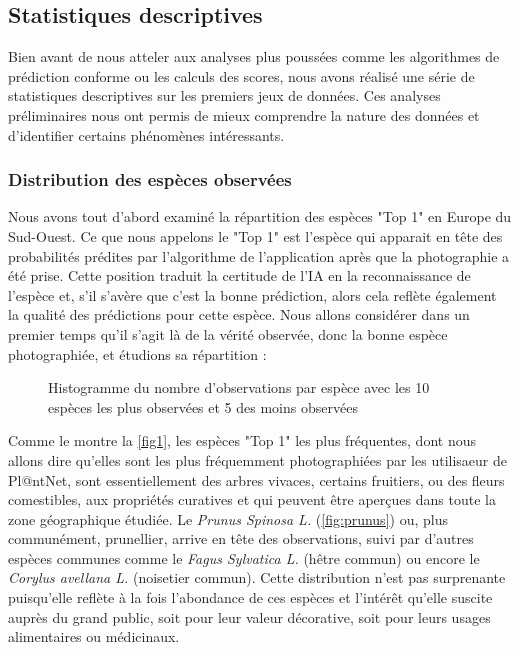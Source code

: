 \documentclass[a4paper,12pt]{article}
\begin{document}

\subsection{Statistiques descriptives}

Bien avant de nous atteler aux analyses plus poussées comme les algorithmes de prédiction conforme ou les calculs des scores, nous avons réalisé une série de statistiques descriptives sur les premiers jeux de données. Ces analyses préliminaires nous ont permis de mieux comprendre la nature des données et d'identifier certains phénomènes intéressants.

\subsubsection{Distribution des espèces observées}

Nous avons tout d'abord examiné la répartition des espèces "Top 1" en Europe du Sud-Ouest. Ce que nous appelons le "Top 1" est l'espèce qui apparait en tête des probabilités prédites par l'algorithme de l'application après que la photographie a été prise. Cette position traduit la certitude de l'IA en la reconnaissance de l'espèce et, s'il s'avère que c'est la bonne prédiction, alors cela reflète également la qualité des prédictions pour cette espèce. Nous allons considérer dans un premier temps qu'il s'agit là de la vérité observée, donc la bonne espèce photographiée, et étudions sa répartition :

\begin{figure}[H]
    \centering
    
    \caption{Histogramme du nombre d'observations par espèce avec les 10 espèces les plus observées et 5 des moins observées}
    \label{fig1}
\end{figure}

Comme le montre la \autoref{fig1}, les espèces "Top 1" les plus fréquentes, dont nous allons dire qu'elles sont les plus fréquemment photographiées par les utilisaeur de Pl@ntNet, sont essentiellement des arbres vivaces, certains fruitiers, ou des fleurs comestibles, aux propriétés curatives et qui peuvent être aperçues dans toute la zone géographique étudiée. Le \textit{Prunus Spinosa L.} (\autoref{fig:prunus}) ou, plus communément, prunellier, arrive en tête des observations, suivi par d'autres espèces communes comme le \textit{Fagus Sylvatica L.} (hêtre commun) ou encore le \textit{Corylus avellana L.} (noisetier commun). Cette distribution n'est pas surprenante puisqu'elle reflète à la fois l'abondance de ces espèces et l'intérêt qu'elle suscite auprès du grand public, soit pour leur valeur décorative, soit pour leurs usages alimentaires ou médicinaux.
\end{document}
